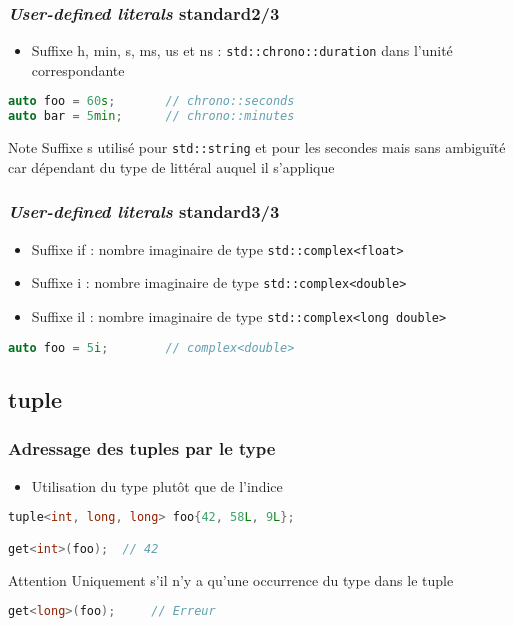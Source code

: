 \documentclass[C++.tex]{subfiles}
\begin{document}
\begin{frame}[fragile]
	\frametitle{\textit{User-defined literals} standard\titlehfill{}2/3}
	\begin{itemize}
		\item Suffixe \og h\fg{}, \og min\fg{}, \og s\fg{}, \og ms\fg{}, \og us\fg{} et \og ns\fg{} : \lstinline|std::chrono::duration| dans l'unité correspondante
	\end{itemize}

	\begin{lstlisting}[language=C++]
auto foo = 60s;       // chrono::seconds
auto bar = 5min;      // chrono::minutes\end{lstlisting}

	\begin{block}{Note}
		Suffixe \og s\fg{} utilisé pour \lstinline|std::string| et pour les secondes mais sans ambiguïté car dépendant du type de littéral auquel il s'applique
	\end{block}
\end{frame}

\begin{frame}[fragile]
	\frametitle{\textit{User-defined literals} standard\titlehfill{}3/3}
	\begin{itemize}
		\item Suffixe \og if\fg{} : nombre imaginaire de type \lstinline|std::complex<float>|
		\item Suffixe \og i\fg{} : nombre imaginaire de type \lstinline|std::complex<double>|
		\item Suffixe \og il\fg{} : nombre imaginaire de type \lstinline|std::complex<long double>|
	\end{itemize}

	\begin{lstlisting}[language=C++]
auto foo = 5i;        // complex<double>\end{lstlisting}
\end{frame}

\subsection*{tuple}
\begin{frame}[fragile]
	\frametitle{Adressage des tuples par le type}
	\begin{itemize}
		\item Utilisation du type plutôt que de l'indice
	\end{itemize}

	\begin{lstlisting}[language=C++]
tuple<int, long, long> foo{42, 58L, 9L};

get<int>(foo);	// 42\end{lstlisting}

	\pause

	\begin{alertblock}{Attention}
		Uniquement s'il n'y a qu'une occurrence du type dans le tuple
	\begin{lstlisting}[language=C++]
get<long>(foo);     // Erreur\end{lstlisting}
	\end{alertblock}
\end{frame}
\end{document}
